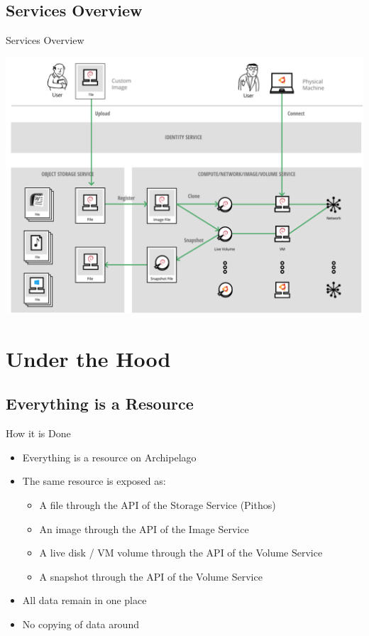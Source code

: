 \documentclass[utf8]{beamer}
\begin{document}
\subsection{Services Overview}

\begin{frame}{Services Overview}
  \begin{center}
    \includegraphics[width=.85\linewidth]{figures/services.png}
  \end{center}
\end{frame}

\section{Under the Hood}

\subsection{Everything is a Resource}

\begin{frame}{How it is Done}
  \begin{itemize}
    \item Everything is a resource on Archipelago
    \item The \alert{same} resource is exposed as:
      \begin{itemize}
        \item A file through the API of the Storage Service (Pithos)
        \item An image through the API of the Image Service
        \item A live disk / VM volume through the API of the Volume Service
        \item A snapshot through the API of the Volume Service
      \end{itemize}
      \item All data remain in one place
      \item No copying of data around
    \end{itemize}
\end{frame}
\end{document}
